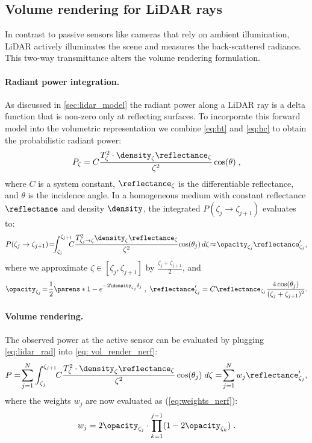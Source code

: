 \subsection{Volume rendering for LiDAR rays}
\label{sec:lidar_vr}
In contrast to passive sensors like cameras that rely on ambient illumination, LiDAR actively illuminates the scene and measures the back-scattered radiance. This two-way transmittance alters the volume rendering formulation. %

\paragraph{Radiant power integration.}
As discussed in \cref{sec:lidar_model} 
the radiant power along a LiDAR ray is a delta function that is non-zero only at reflecting surfaces. To incorporate this forward model into the volumetric representation we combine \cref{eq:ht} and \cref{eq:hc} to obtain the 
probabilistic radiant power:
\begin{equation}
P_\zeta = C \frac{T^2_{\zeta} \cdot \density_\zeta  \reflectance_\zeta}{\zeta^2} \cos(\theta)\;,
\label{eq:radiance}
\end{equation}
where $C$ is a system constant, $\reflectance_\zeta$ is the differentiable reflectance, and $\theta$ is the incidence angle.
In a homogeneous medium with constant reflectance $\reflectance$ and density $\density$, the integrated $P(\zeta_j \rightarrow \zeta_{j+1})$ evaluates to:
\begin{equation}
     P(\zeta_j \rightarrow \zeta_{j+1}) 
     \!=\!\!\!\int_{\zeta_j}^{\zeta_{j+1}}\!\!\!\!C \frac{T^2_{\zeta_j \rightarrow \zeta} \density_\zeta \reflectance_\zeta}{\zeta^2}\!\cos(\theta_{j})\,d\zeta
     \!\approx\!\opacity_{\zeta_j} \reflectance_{\zeta_j}', 
\label{eq:lidar_rad}
\end{equation}
where we approximate $\zeta \in [\zeta_j, \zeta_{j+1}]$ by $\frac{\zeta_j + \zeta_{j+1}}{2}$, and 
\begin{equation}
    \opacity_{\zeta_j}\!=\!\frac{1}{2}\parens*{1- e^{-2\density_{\zeta_j}\delta_j}}\;,\; \reflectance_{\zeta_j}' = C \reflectance_{\zeta_j}\frac{4 \cos(\theta_j)}{(\zeta_j + \zeta_{j+1})^2}.
\end{equation}


\paragraph{Volume rendering.}
The observed power at the active sensor can be evaluated by plugging \cref{eq:lidar_rad} into \cref{eq: vol_render_nerf}: 
\begin{equation}
      P
      =\!\sum_{j=1}^N \int_{\zeta_j}^{\zeta_{j+1}}\!\!C \frac{T^2_{\zeta} \cdot \density_\zeta \reflectance_\zeta}{\zeta^2} \cos(\theta_j) \; d\zeta
      =\!\sum_{j=1}^N w_j \reflectance_{\zeta_j}',
\end{equation}
where the weights $w_j$ are now evaluated as (\cf \cref{eq:weights_nerf}):
\begin{equation}
   w_j = 2 \opacity_{\zeta_j} \cdot\prod_{k=1}^{j-1}(1 - 2 \opacity_{\zeta_k})\;.
\label{eq:lidar_weights}
\end{equation}